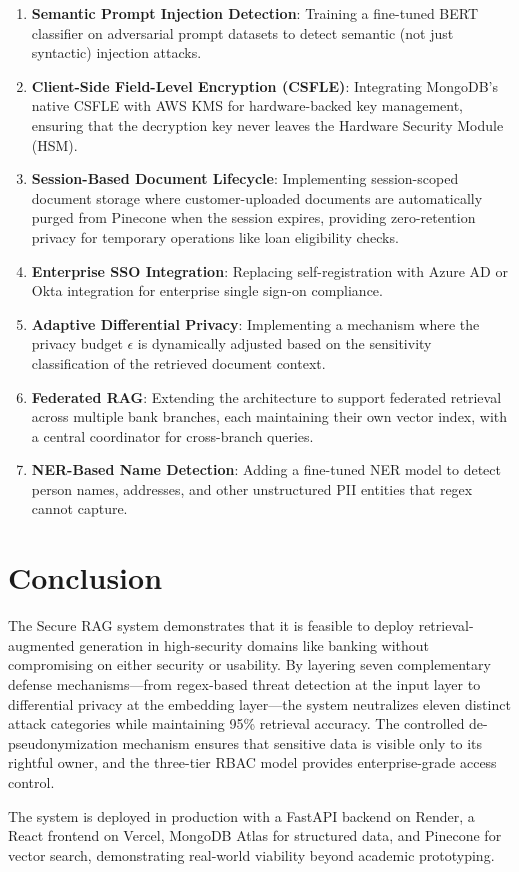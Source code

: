 \begin{enumerate}
    \item \textbf{Semantic Prompt Injection Detection}: Training a fine-tuned BERT classifier on adversarial prompt datasets to detect semantic (not just syntactic) injection attacks.
    
    \item \textbf{Client-Side Field-Level Encryption (CSFLE)}: Integrating MongoDB's native CSFLE with AWS KMS for hardware-backed key management, ensuring that the decryption key never leaves the Hardware Security Module (HSM).
    
    \item \textbf{Session-Based Document Lifecycle}: Implementing session-scoped document storage where customer-uploaded documents are automatically purged from Pinecone when the session expires, providing zero-retention privacy for temporary operations like loan eligibility checks.
    
    \item \textbf{Enterprise SSO Integration}: Replacing self-registration with Azure AD or Okta integration for enterprise single sign-on compliance.
    
    \item \textbf{Adaptive Differential Privacy}: Implementing a mechanism where the privacy budget $\epsilon$ is dynamically adjusted based on the sensitivity classification of the retrieved document context.
    
    \item \textbf{Federated RAG}: Extending the architecture to support federated retrieval across multiple bank branches, each maintaining their own vector index, with a central coordinator for cross-branch queries.
    
    \item \textbf{NER-Based Name Detection}: Adding a fine-tuned NER model to detect person names, addresses, and other unstructured PII entities that regex cannot capture.
\end{enumerate}

\section{Conclusion}

The Secure RAG system demonstrates that it is feasible to deploy retrieval-augmented generation in high-security domains like banking without compromising on either security or usability. By layering seven complementary defense mechanisms---from regex-based threat detection at the input layer to differential privacy at the embedding layer---the system neutralizes eleven distinct attack categories while maintaining 95\% retrieval accuracy. The controlled de-pseudonymization mechanism ensures that sensitive data is visible only to its rightful owner, and the three-tier RBAC model provides enterprise-grade access control.

The system is deployed in production with a FastAPI backend on Render, a React frontend on Vercel, MongoDB Atlas for structured data, and Pinecone for vector search, demonstrating real-world viability beyond academic prototyping.
